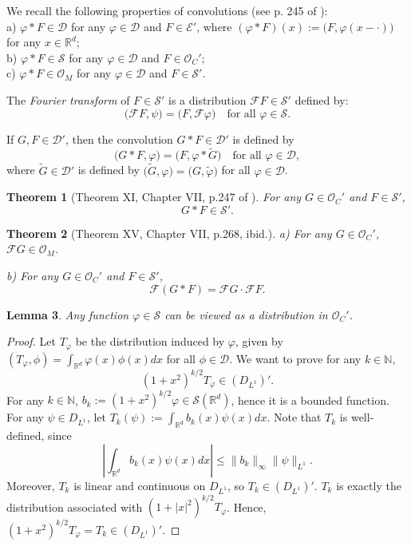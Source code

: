 \documentclass[12pt]{article}
\newtheorem{theorem}{Theorem}[section]
\newtheorem{lemma}[theorem]{Lemma}
\def\cD{\mathcal{D}}
\def\cE{\mathcal{E}}
\def\cF{\mathcal{F}}
\def\cO{\mathcal{O}}
\def\cS{\mathcal{S}}
\def\bN{\mathbb{N}}
\def\bR{\mathbb{R}}
\begin{document}
\medskip


We recall the following properties of convolutions (see p. 245 of \cite{schwartz66}):\\
a) $\varphi * F \in \cD$ for any $\varphi \in \cD$  and $F \in \cE'$,  where $(\varphi *F)(x):=\big( F, \varphi(x-\cdot)\big)$ for any $x \in \bR^d$;\\
b)  $\varphi * F \in \cS$ for any $\varphi \in \cD$  and $F \in \cO_C'$;\\ 
c)  $\varphi * F \in \cO_M$ for any $\varphi \in \cD$  and $F \in \cS'$.



\medskip





The {\em Fourier transform} of $F \in \cS'$ is a distribution $\cF F \in \cS'$ defined by:
\[
\big( \cF F,\psi\big)=\big(F,\cF \varphi\big) \quad \mbox{for all $\varphi \in \cS$}.
\]

If $G,F \in \cD'$, then the convolution $G*F \in \cD'$ is defined by
\[
\big( G*F,\varphi\big)=\big(F,\varphi* \widetilde{G} \big) \quad \mbox{for all $\varphi \in \cD$},
\]
where $\widetilde{G}\in \cD'$ is defined by $\big(\widetilde{G}, \varphi\big)=\big( G,\widetilde{\varphi}\big)$ for all $\varphi \in \cD$.



\begin{theorem}[Theorem XI, Chapter VII, p.247 of \cite{schwartz66}] 
\label{GF1}
For any $G \in \cO_C'$ and $F \in \cS'$, 
\[
G*F \in \cS'.
\] 

\end{theorem}

\begin{theorem}[Theorem XV, Chapter VII, p.268, ibid.]  
\label{GF2}
a) For any $G \in \cO_C'$, $\cF G \in \cO_M$.

b) For any $G \in \cO_C'$ and $F \in \cS'$,  
\[
\cF(G*F) =\cF G \cdot \cF F.
\]
\end{theorem}


\begin{lemma}
\label{SO-lem}
Any function $\varphi \in \cS$ can be viewed as a distribution in $\cO_{C}'$.
\end{lemma}

\begin{proof}
Let $T_{\varphi}$ be the distribution induced by $\varphi$, given by $(T_{\varphi},\phi)=\int_{\bR^d}\varphi(x) \phi(x) dx$ for all $\phi \in \cD$. We want to prove for any $k\in \bN$,
\[
(1+x^2)^{k/2}T_\varphi\in (D_{L^1})'.
\]
For any $k\in\bN$, $b_k:=(1+x^2)^{k/2}\varphi \in \cS(\bR^d)$, hence it is a bounded function. For any $\psi\in D_{L^1}$, let $T_k(\psi):=\int_{\bR^d} b_k(x)\psi(x)dx$. Note that $T_k$ is well-defined, since
\[
\left|\int_{\bR^d} b_k(x)\psi(x)dx\right| \le \|b_k\|_\infty \|\psi\|_{L^1}.
\]
Moreover, $T_k$ is linear and continuous on $D_{L^1}$, so $T_k\in (D_{L^1})'$. $T_k$ is exactly the distribution associated with $(1+|x|^2)^{k/2}T_{\varphi}$. Hence, $(1+x^2)^{k/2}T_\varphi=T_k \in (D_{L^1})'$.



\end{proof}
\end{document}
